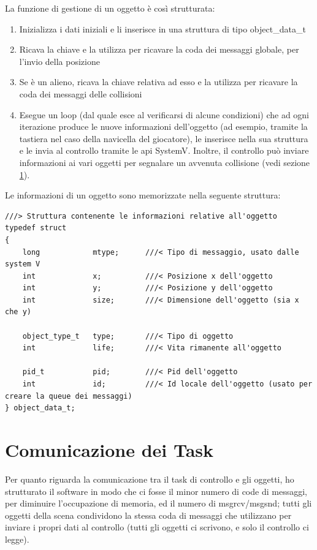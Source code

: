 \documentclass[a4paper,11pt]{report}
\begin{document}
La funzione di gestione di un oggetto è così strutturata:
\begin{enumerate}
  \item Inizializza i dati iniziali e li inserisce in una struttura di tipo object_data_t
  \item Ricava la chiave e la utilizza per ricavare la coda dei messaggi globale, per l'invio della posizione
  \item Se è un alieno, ricava la chiave relativa ad esso e la utilizza per ricavare la coda dei messaggi delle collisioni
  \item Esegue un loop (dal quale esce al verificarsi di alcune condizioni) che ad ogni iterazione 
    produce le nuove informazioni dell'oggetto (ad esempio, tramite la tastiera nel caso
    della navicella del giocatore), le inserisce nella sua struttura e le invia
    al controllo tramite le api SystemV. Inoltre, il controllo può inviare informazioni ai vari oggetti
    per segnalare un avvenuta collisione (vedi sezione \ref{sec:comun}).
\end{enumerate}

Le informazioni di un oggetto sono memorizzate nella seguente struttura: 

\begin{verbatim}
///> Struttura contenente le informazioni relative all'oggetto
typedef struct
{
	long 			mtype;		///< Tipo di messaggio, usato dalle system V
	int 			x;			///< Posizione x dell'oggetto
	int				y;			///< Posizione y dell'oggetto
	int 			size;		///< Dimensione dell'oggetto (sia x che y)
	
	object_type_t	type;		///< Tipo di oggetto
	int				life;		///< Vita rimanente all'oggetto
	
	pid_t			pid;		///< Pid dell'oggetto
	int				id;			///< Id locale dell'oggetto (usato per creare la queue dei messaggi)
} object_data_t;
\end{verbatim}


\section{Comunicazione dei Task} \label{sec:comun}
Per quanto riguarda la comunicazione tra il task di controllo e gli oggetti, ho strutturato il software 
in modo che ci fosse il minor numero di code di messaggi, per diminuire 
l'occupazione di memoria, ed il numero di msgrcv/msgsnd; tutti gli oggetti della scena
condividono la stessa coda di messaggi che utilizzano per inviare i propri dati al controllo (tutti gli 
oggetti ci scrivono, e solo il controllo ci legge).
\end{document}
